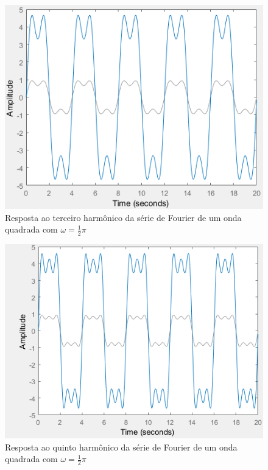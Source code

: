 \documentclass[a4paper, 12pt]{article}
\begin{document}
			\begin{figure}[!ht]
				\centering
				\includegraphics[scale=0.71]{img/2j.png}
				\caption{Resposta ao terceiro harmônico da série de Fourier de um onda quadrada com $\omega = \frac{1}{2}\pi$}
			\end{figure}
			\begin{figure}[!ht]
				\centering
				\includegraphics[scale=0.71]{img/2k.png}
				\caption{Resposta ao quinto harmônico da série de Fourier de um onda quadrada com $\omega = \frac{1}{2}\pi$}
			\end{figure}
\end{document}
